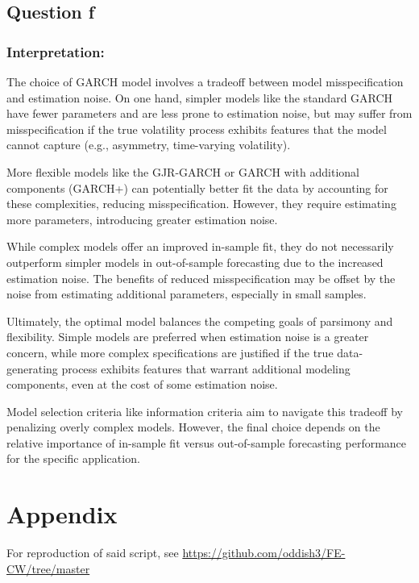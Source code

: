 \documentclass{article}
\begin{document}
\subsection*{Question f}
\subsubsection*{Interpretation:}

The choice of GARCH model involves a tradeoff between model misspecification and estimation noise. On one hand, simpler models like the standard GARCH have fewer parameters and are less prone to estimation noise, but may suffer from misspecification if the true volatility process exhibits features that the model cannot capture (e.g., asymmetry, time-varying volatility).

More flexible models like the GJR-GARCH or GARCH with additional components (GARCH+) can potentially better fit the data by accounting for these complexities, reducing misspecification. However, they require estimating more parameters, introducing greater estimation noise.

While complex models offer an improved in-sample fit, they do not necessarily outperform simpler models in out-of-sample forecasting due to the increased estimation noise. The benefits of reduced misspecification may be offset by the noise from estimating additional parameters, especially in small samples.

Ultimately, the optimal model balances the competing goals of parsimony and flexibility. Simple models are preferred when estimation noise is a greater concern, while more complex specifications are justified if the true data-generating process exhibits features that warrant additional modeling components, even at the cost of some estimation noise.

Model selection criteria like information criteria aim to navigate this tradeoff by penalizing overly complex models. However, the final choice depends on the relative importance of in-sample fit versus out-of-sample forecasting performance for the specific application.

\newpage
\section*{Appendix}

For reproduction of said script, see \url{https://github.com/oddish3/FE-CW/tree/master}


\end{document}
